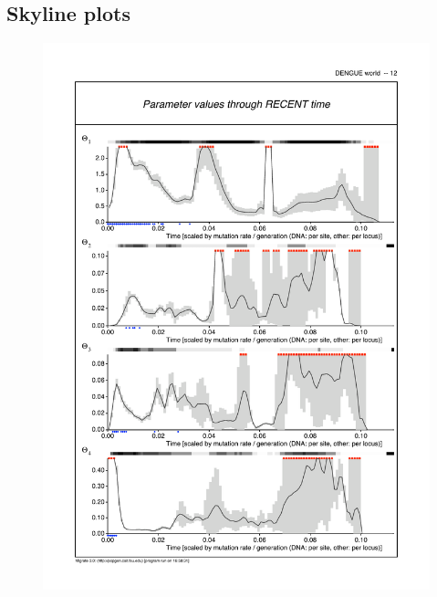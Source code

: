\subsection{Skyline plots}

\begin{figure}[!h]
\begin{center}
\includegraphics[scale=0.9]{mim/skylineTheta}\\


\end{center}
\end{figure}
